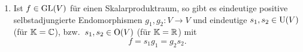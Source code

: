 \begin{theorem}
  \begin{enumerate}[leftmargin=*, label=\roman*)]
    \item
      Ist $f \in \mathrm{GL}(V)$ für einen Skalarproduktraum, so gibt es eindeutige positive selbstadjungierte Endomorphismen $g_1, g_2 \colon V \to V$ und eindeutige $s_1, s_2 \in \mathrm{U}(V)$ (für $\mathbb{K} = \mathbb{C}$), bzw.\ $s_1, s_2 \in \mathrm{O}(V)$ (für $\mathbb{K} = \mathbb{R}$) mit
      \[
        f = s_1 g_1 = g_2 s_2.
      \]
  \end{enumerate}
\end{theorem}




























